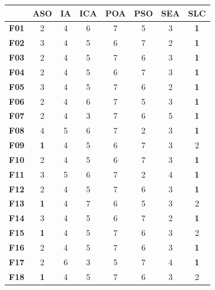 \begin{table}
	\centering
	\begin{tabular}{cccccccc}
		\toprule
		{} &    \textbf{ASO} &     \textbf{IA} &    \textbf{ICA} &    \textbf{POA} &    \textbf{PSO} &    \textbf{SEA} &    \textbf{SLC} \\
		\midrule
		\textbf{F01}  &      2 &      4 &      6 &      7 &      5 &      3 &      \textbf{1} \\
		\textbf{F02}  &      3 &      4 &      5 &      6 &      7 &      2 &      \textbf{1} \\
		\textbf{F03}  &      2 &      4 &      5 &      7 &      6 &      3 &      \textbf{1} \\
		\textbf{F04}  &      2 &      4 &      5 &      6 &      7 &      3 &      \textbf{1} \\
		\textbf{F05}  &      3 &      4 &      5 &      7 &      6 &      2 &      \textbf{1} \\
		\textbf{F06}  &      2 &      4 &      6 &      7 &      5 &      3 &      \textbf{1} \\
		\textbf{F07}  &      2 &      4 &      3 &      7 &      6 &      5 &      \textbf{1} \\
		\textbf{F08}  &      4 &      5 &      6 &      7 &      2 &      3 &      \textbf{1} \\
		\textbf{F09}  &      \textbf{1} &      4 &      5 &      6 &      7 &      3 &      2 \\
		\textbf{F10}  &      2 &      4 &      5 &      6 &      7 &      3 &      \textbf{1} \\
		\textbf{F11}  &      3 &      5 &      6 &      7 &      2 &      4 &      \textbf{1} \\
		\textbf{F12}  &      2 &      4 &      5 &      7 &      6 &      3 &      \textbf{1} \\
		\textbf{F13}  &      \textbf{1} &      4 &      7 &      6 &      5 &      3 &      2 \\
		\textbf{F14}  &      3 &      4 &      5 &      6 &      7 &      2 &      \textbf{1} \\
		\textbf{F15}  &      \textbf{1} &      4 &      5 &      7 &      6 &      3 &      2 \\
		\textbf{F16}  &      2 &      4 &      5 &      7 &      6 &      3 &      \textbf{1} \\
		\textbf{F17}  &      2 &      6 &      3 &      5 &      7 &      4 &      \textbf{1} \\
		\textbf{F18}  &      \textbf{1} &      4 &      5 &      7 &      6 &      3 &      2 \\

\end{tabular}
\end{table}
